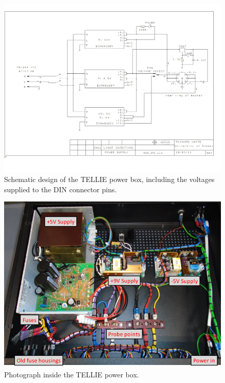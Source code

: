 \documentclass[12pt]{report}
\begin{document}
\begin{figure}[htbp]
	\begin{center}
		\includegraphics[width=1.0\textwidth]{PowerBoxSchematic}
		\caption{Schematic design of the TELLIE power box, including the voltages supplied to the DIN connector pins.}
		\label{fig:PowerBoxSchematic}
	\end{center}
\end{figure}


\begin{figure}[htbp]
	\begin{center}
		\includegraphics[width=1.0\textwidth]{PowerBoxInside}
		\caption{Photograph inside the TELLIE power box.}
		\label{fig:PowerBoxInside}
	\end{center}
\end{figure}
\end{document}
